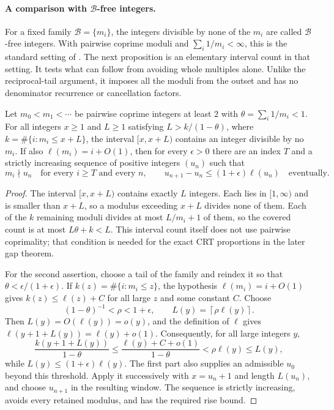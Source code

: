 \documentclass[11pt]{article}
\begin{document}
\paragraph{A comparison with $\mathcal B$-free integers.}
For a fixed family $\mathcal B=\{m_i\}$, the integers divisible by none
of the $m_i$ are called $\mathcal B$-free integers. With pairwise coprime
moduli and $\sum_i1/m_i<\infty$, this is the standard setting of
\cite[\S1.2]{elabdalaoui2015}. The next proposition is an elementary
interval count in that setting. It tests what can follow from avoiding
whole multiples alone. Unlike the reciprocal-tail argument, it imposes
all the moduli from the outset and has no denominator recurrence or
cancellation factors.

\begin{proposition}\label{long243:res:coprimalitycap}
Let $m_0<m_1<\cdots$ be pairwise coprime integers at least $2$ with
$\theta=\sum_i1/m_i<1$. For all integers $x\ge1$ and $L\ge1$ satisfying
$L>k/(1-\theta)$, where $k=\#\{i:m_i\le x+L\}$, the interval $[x,x+L)$ contains
an integer divisible by no $m_i$. If also $\ell(m_i)=i+O(1)$, then for
every $\epsilon>0$ there are an index $T$ and a strictly increasing
sequence of positive integers $(u_n)$ such that
\[
 m_i\nmid u_n\quad\text{for every }i\ge T\text{ and every }n,
 \qquad
 u_{n+1}-u_n\le(1+\epsilon)\ell(u_n)\quad\text{eventually}.
\]
\end{proposition}

\begin{proof}
The interval $[x,x+L)$ contains exactly $L$ integers.  Each lies in
$[1,\infty)$ and is smaller than $x+L$, so a
modulus exceeding $x+L$ divides none of them. Each of the $k$ remaining
moduli divides at most $L/m_i+1$ of them, so the covered count is at most
$L\theta+k<L$. This interval count itself does not use pairwise
coprimality; that condition is needed for the exact CRT proportions
in the later gap theorem.

For the second assertion, choose a tail of the family and reindex it so that
$\theta<\epsilon/(1+\epsilon)$.  If
$k(z)=\#\{i:m_i\le z\}$, the hypothesis $\ell(m_i)=i+O(1)$ gives
$k(z)\le\ell(z)+C$ for all large $z$ and some constant $C$.  Choose
\[
 (1-\theta)^{-1}<\rho<1+\epsilon,
 \qquad L(y)=\left\lceil\rho\ell(y)\right\rceil .
\]
Then $L(y)=O(\ell(y))=o(y)$, and the definition of $\ell$ gives
$\ell(y+1+L(y))=\ell(y)+o(1)$.  Consequently, for all large integers $y$,
\[
 \frac{k(y+1+L(y))}{1-\theta}
 \le \frac{\ell(y)+C+o(1)}{1-\theta}
 < \rho\ell(y)\le L(y),
\]
while $L(y)\le(1+\epsilon)\ell(y)$.  The first part also supplies an admissible $u_0$ beyond this threshold.
Apply it successively with $x=u_n+1$ and length $L(u_n)$, and choose
$u_{n+1}$ in the resulting window.  The sequence is strictly increasing,
avoids every retained modulus, and has the required rise bound.
\end{proof}
\end{document}
